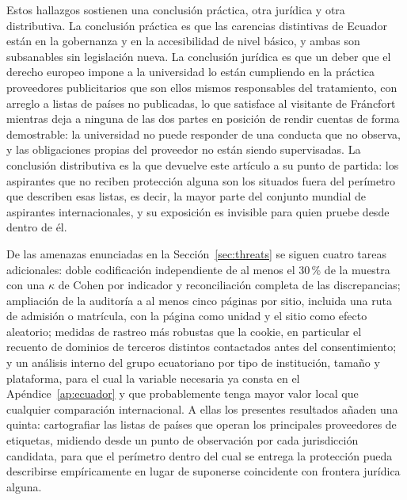 \documentclass[pdflatex,sn-basic,Numbered,iicol]{sn-jnl}
\theoremstyle{thmstyleone}
\theoremstyle{thmstyletwo}
\theoremstyle{thmstylethree}
\begin{document}
Estos hallazgos sostienen una conclusi\'on pr\'actica, otra jur\'idica y otra distributiva. La conclusi\'on pr\'actica es que las carencias distintivas de Ecuador est\'an en la gobernanza y en la accesibilidad de nivel b\'asico, y ambas son subsanables sin legislaci\'on nueva. La conclusi\'on jur\'idica es que un deber que el derecho europeo impone a la universidad lo est\'an cumpliendo en la pr\'actica proveedores publicitarios que son ellos mismos responsables del tratamiento, con arreglo a listas de pa\'ises no publicadas, lo que satisface al visitante de Fr\'ancfort mientras deja a ninguna de las dos partes en posici\'on de rendir cuentas de forma demostrable: la universidad no puede responder de una conducta que no observa, y las obligaciones propias del proveedor no est\'an siendo supervisadas. La conclusi\'on distributiva es la que devuelve este art\'iculo a su punto de partida: los aspirantes que no reciben protecci\'on alguna son los situados fuera del per\'imetro que describen esas listas, es decir, la mayor parte del conjunto mundial de aspirantes internacionales, y su exposici\'on es invisible para quien pruebe desde dentro de \'el.

De las amenazas enunciadas en la Secci\'on~\ref{sec:threats} se siguen cuatro tareas adicionales: doble codificaci\'on independiente de al menos el 30\,\% de la muestra con una $\kappa$ de Cohen por indicador y reconciliaci\'on completa de las discrepancias; ampliaci\'on de la auditor\'ia a al menos cinco p\'aginas por sitio, incluida una ruta de admisi\'on o matr\'icula, con la p\'agina como unidad y el sitio como efecto aleatorio; medidas de rastreo m\'as robustas que la cookie, en particular el recuento de dominios de terceros distintos contactados antes del consentimiento; y un an\'alisis interno del grupo ecuatoriano por tipo de instituci\'on, tama\~no y plataforma, para el cual la variable necesaria ya consta en el Ap\'endice~\ref{ap:ecuador} y que probablemente tenga mayor valor local que cualquier comparaci\'on internacional. A ellas los presentes resultados a\~naden una quinta: cartografiar las listas de pa\'ises que operan los principales proveedores de etiquetas, midiendo desde un punto de observaci\'on por cada jurisdicci\'on candidata, para que el per\'imetro dentro del cual se entrega la protecci\'on pueda describirse emp\'iricamente en lugar de suponerse coincidente con frontera jur\'idica alguna.

\backmatter

\end{document}
